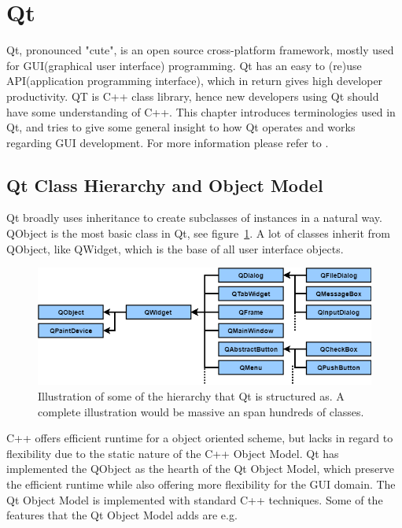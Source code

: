 \section{Qt}
\label{sec:qt}
Qt, pronounced "cute", is an open source cross-platform framework, mostly used for GUI(graphical user interface) programming. Qt has an easy to (re)use API(application programming interface), which in return gives high developer productivity. QT is C++ class library, hence new developers using Qt should have some understanding of C++.
This chapter introduces terminologies used in Qt, and tries to give some general insight to how Qt operates and works regarding GUI development. For more information please refer to \cite{QtDocumentation}.




\subsection{Qt Class Hierarchy and Object Model}
\label{sec:QtClassHierarchyAndObjectModel}
Qt broadly uses inheritance to create subclasses of instances in a natural way. QObject is the most basic class in Qt, see figure~\ref{fig:QtHeirachy}. A lot of classes inherit from QObject, like QWidget, which is the base of all user interface objects. 

\begin{figure}[h]
	\centering
	\includegraphics[scale=0.55]{Figures/QtHierachy.png}
	\caption{Illustration of some of the hierarchy that Qt is structured as. A complete illustration would be massive an span hundreds of classes.}
	\label{fig:QtHeirachy}
\end{figure}

C++ offers efficient runtime for a object oriented scheme, but lacks in regard to flexibility due to the static nature of the C++ Object Model. Qt has implemented the QObject as the hearth of the Qt Object Model, which preserve the efficient runtime while also offering more flexibility for the GUI domain. The Qt Object Model is implemented with standard C++ techniques. Some of the features that the Qt Object Model adds are e.g.

